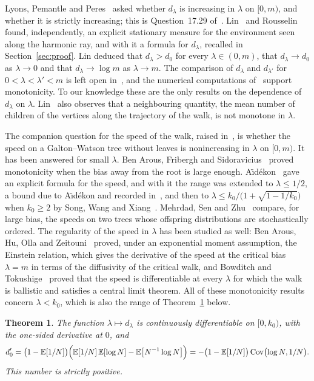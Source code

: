 \documentclass[11pt]{amsart}
\newtheorem{theorem}{Theorem}
\theoremstyle{definition}
\newcommand{\E}{\mathbb{E}}
\newcommand{\Cov}{\operatorname{Cov}}
\begin{document}
Lyons, Pemantle and Peres~\cite{LPP97} asked whether $d_\lambda$ is increasing in $\lambda$ on $[0,m)$, and
whether it is strictly increasing; this is Question~17.29 of~\cite{LyonsPeres}. Lin~\cite{Lin} and
Rousselin~\cite{Rousselin} found, independently, an explicit stationary measure for the environment seen along
the harmonic ray, and with it a formula for $d_\lambda$, recalled in Section~\ref{sec:proof}. Lin deduced that
$d_\lambda>d_0$ for every $\lambda\in(0,m)$, that $d_\lambda\to d_0$ as $\lambda\to0$ and that
$d_\lambda\to\log m$ as $\lambda\to m$. The comparison of $d_\lambda$ and $d_{\lambda'}$ for
$0<\lambda<\lambda'<m$ is left open in~\cite{Lin}, and the numerical computations of~\cite{Rousselin} support
monotonicity. To our knowledge these are the only results on the dependence of $d_\lambda$ on $\lambda$.
Lin~\cite{Lin} also observes that a neighbouring quantity, the mean number of children of the vertices along the
trajectory of the walk, is not monotone in $\lambda$.

The companion question for the speed of the walk, raised in~\cite{LPP96,LPP97}, is whether the speed on a
Galton--Watson tree without leaves is nonincreasing in $\lambda$ on $[0,m)$. It has been answered for small
$\lambda$. Ben Arous, Fribergh and Sidoravicius~\cite{BFS} proved monotonicity when the bias away from the root
is large enough. A\"{\i}d\'ekon~\cite{Aidekon} gave an explicit formula for the speed, and with it the range was
extended to $\lambda\le1/2$, a bound due to A\"{\i}d\'ekon and recorded in~\cite{SWX}, and then to
$\lambda\le k_0/\bigl(1+\sqrt{1-1/k_0}\bigr)$ when $k_0\ge2$ by Song, Wang and Xiang~\cite{SWX}. Mehrdad, Sen and
Zhu~\cite{MSZ} compare, for large bias, the speeds on two trees whose offspring distributions are stochastically
ordered. The regularity of the speed in $\lambda$ has been studied as well: Ben Arous, Hu, Olla and
Zeitouni~\cite{BHOZ} proved, under an exponential moment assumption, the Einstein relation, which gives the derivative of the speed at the critical
bias $\lambda=m$ in terms of the diffusivity of the critical walk, and Bowditch and Tokushige~\cite{BT} proved that
the speed is differentiable at every $\lambda$ for which the walk is ballistic and satisfies a central limit
theorem. All of these monotonicity results concern $\lambda<k_0$, which is also the range of
Theorem~\ref{thm:main} below.

\begin{theorem}\label{thm:main}
The function $\lambda\mapsto d_\lambda$ is continuously differentiable on $[0,k_0)$, with the one-sided
derivative at $0$, and
\begin{equation}\label{eq:slope}
   d_0'=\bigl(1-\E[1/N]\bigr)\Bigl(\E[1/N]\,\E[\log N]-\E\bigl[N^{-1}\log N\bigr]\Bigr)
       =-\bigl(1-\E[1/N]\bigr)\Cov\bigl(\log N,1/N\bigr) .
\end{equation}
This number is strictly positive.
\end{theorem}
\end{document}

